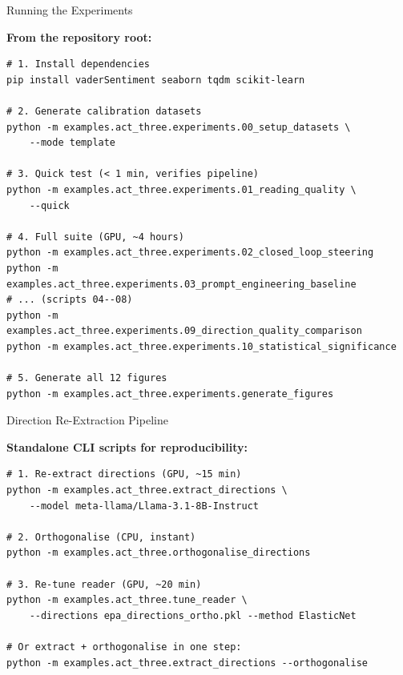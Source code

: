 \documentclass[aspectratio=169,11pt]{beamer}
\begin{document}
\begin{frame}[fragile]{Running the Experiments}

\textbf{From the repository root:}

\begin{verbatim}
# 1. Install dependencies
pip install vaderSentiment seaborn tqdm scikit-learn

# 2. Generate calibration datasets
python -m examples.act_three.experiments.00_setup_datasets \
    --mode template

# 3. Quick test (< 1 min, verifies pipeline)
python -m examples.act_three.experiments.01_reading_quality \
    --quick

# 4. Full suite (GPU, ~4 hours)
python -m examples.act_three.experiments.02_closed_loop_steering
python -m examples.act_three.experiments.03_prompt_engineering_baseline
# ... (scripts 04--08)
python -m examples.act_three.experiments.09_direction_quality_comparison
python -m examples.act_three.experiments.10_statistical_significance

# 5. Generate all 12 figures
python -m examples.act_three.experiments.generate_figures
\end{verbatim}
\end{frame}

\begin{frame}[fragile]{Direction Re-Extraction Pipeline}

\textbf{Standalone CLI scripts for reproducibility:}

\begin{verbatim}
# 1. Re-extract directions (GPU, ~15 min)
python -m examples.act_three.extract_directions \
    --model meta-llama/Llama-3.1-8B-Instruct

# 2. Orthogonalise (CPU, instant)
python -m examples.act_three.orthogonalise_directions

# 3. Re-tune reader (GPU, ~20 min)
python -m examples.act_three.tune_reader \
    --directions epa_directions_ortho.pkl --method ElasticNet

# Or extract + orthogonalise in one step:
python -m examples.act_three.extract_directions --orthogonalise
\end{verbatim}
\end{frame}
\end{document}
